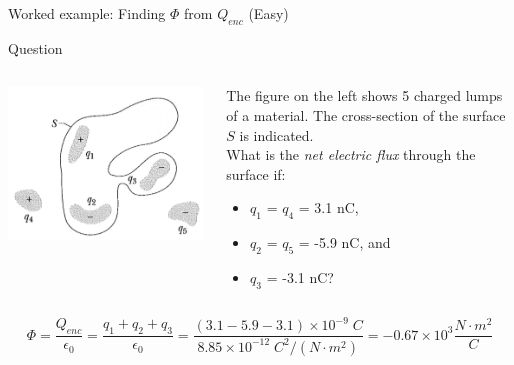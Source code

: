 {\begin{frame}{Worked example: Finding $\Phi$ from $Q_{enc}$ (Easy)}
  \begin{blockexmplque}{Question}
    \begin{columns}
      \begin{column}{0.40\textwidth}
        \begin{center}
          \includegraphics[width=0.99\textwidth]{./images/problems/lect02_enclosed_charges.png}\\
        \end{center}
      \end{column}
      \begin{column}{0.60\textwidth}
        The figure on the left shows 5 charged lumps of a material.
        The cross-section of the surface $S$ is indicated.\\
        What is the {\em net electric flux} through the surface if:\\
        \begin{itemize}
         \item $q_1$ = $q_4$ = 3.1 nC,
         \item $q_2$ = $q_5$ = -5.9 nC, and
         \item $q_3$ = -3.1 nC?
        \end{itemize}
     \end{column}
   \end{columns}
  \end{blockexmplque}
  \vspace{0.2cm}
  \begin{equation*}
  \Phi =
    \frac{Q_{enc}}{\epsilon_0} =
    \frac{q_1+q_2+q_3}{\epsilon_0} =
    \frac{(3.1 - 5.9 - 3.1) \times 10^{-9} \; C}{8.85 \times 10^{-12} \; C^2/(N \cdot m^2)} =
    -0.67 \times 10^{3} \frac{N \cdot m^2}{C}
  \end{equation*}

\end{frame}

} %

